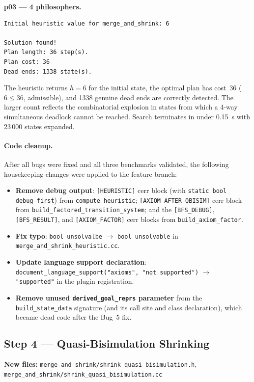 \documentclass[11pt,a4paper]{article}
\begin{document}
\textbf{p03 — 4 philosophers.}

\begin{lstlisting}
Initial heuristic value for merge_and_shrink: 6

Solution found!
Plan length: 36 step(s).
Plan cost: 36
Dead ends: 1338 state(s).
\end{lstlisting}

The heuristic returns $h = 6$ for the initial state, the optimal plan has
cost~36 ($6 \le 36$, admissible), and 1338 genuine dead ends are correctly
detected.  The larger count reflects the combinatorial explosion in states from
which a 4-way simultaneous deadlock cannot be reached.  Search terminates in
under 0.15~s with 23\,000 states expanded.

\paragraph{Code cleanup.}

After all bugs were fixed and all three benchmarks validated, the following
housekeeping changes were applied to the feature branch:

\begin{itemize}
  \item \textbf{Remove debug output}: \texttt{[HEURISTIC]} cerr block (with
        \texttt{static bool debug\_first}) from \texttt{compute\_heuristic};
        \texttt{[AXIOM\_AFTER\_QBISIM]} cerr block from
        \texttt{build\_factored\_transition\_system}; and the
        \texttt{[BFS\_DEBUG]}, \texttt{[BFS\_RESULT]}, and
        \texttt{[AXIOM\_FACTOR]} cerr blocks from \texttt{build\_axiom\_factor}.
  \item \textbf{Fix typo}: \texttt{bool unsolvalbe} $\to$
        \texttt{bool unsolvable} in \texttt{merge\_and\_shrink\_heuristic.cc}.
  \item \textbf{Update language support declaration}:
        \texttt{document\_language\_support("axioms",\,"not\,supported")}
        $\to$ \texttt{"supported"} in the plugin registration.
  \item \textbf{Remove unused \texttt{derived\_goal\_reprs} parameter} from
        the \texttt{build\_state\_data} signature (and its call site and class
        declaration), which became dead code after the Bug~5 fix.
\end{itemize}

\subsection{Step 4 — Quasi-Bisimulation Shrinking}
\textbf{New files:} \texttt{merge\_and\_shrink/shrink\_quasi\_bisimulation.h},
\texttt{merge\_and\_shrink/shrink\_quasi\_bisimulation.cc}
\end{document}
